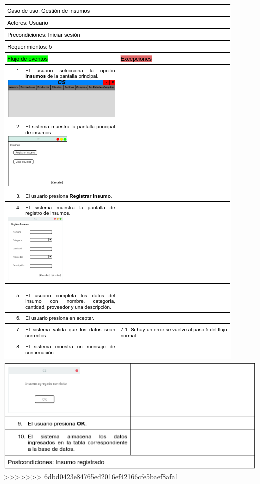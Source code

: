 \documentclass{article}
\begin{document}
	\includegraphics[width=1\linewidth]{imagenes/especificacion_insumos.png}
	\includegraphics[width=1\linewidth]{imagenes/especificacion_insumos2.png}
>>>>>>> 6dbd0423e84765ed2016ef42166cfe5baef8afa1
\end{document}
